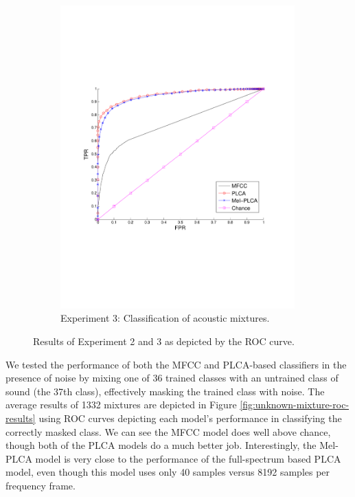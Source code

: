 \documentclass[a4paper,10pt,final]{ThesisStyle}
\begin{document}
\begin{figure}
\begin{subfigure}[b]{0.48\textwidth}
		\includegraphics[width=0.99\textwidth]{images/mixture-roc-results.pdf}
		\caption{Experiment 3: Classification of acoustic mixtures.}
		\label{fig:mixture-roc-results}
	\end{subfigure}
	\caption{Results of Experiment 2 and 3 as depicted by the ROC curve.}
\end{figure}

We tested the performance of both the MFCC and PLCA-based classifiers in the presence of noise by mixing one of 36 trained classes with an untrained class of sound (the 37th class), effectively masking the trained class with noise.  The average results of 1332 mixtures are depicted in Figure \ref{fig:unknown-mixture-roc-results} using ROC curves depicting each model's performance in classifying the correctly masked class.  We can see the MFCC model does well above chance, though both of the PLCA models do a much better job.  Interestingly, the Mel-PLCA model is very close to the performance of the full-spectrum based PLCA model, even though this model uses only 40 samples versus 8192 samples per frequency frame.
\end{document}
